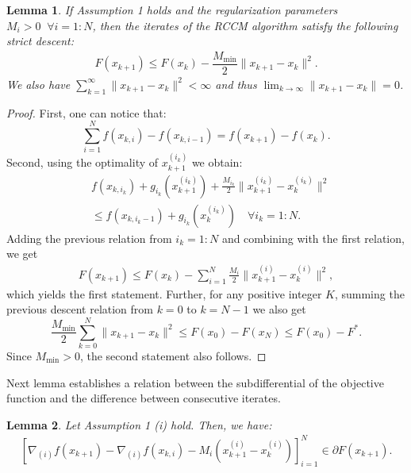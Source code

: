 \documentclass[lettersize,journal]{IEEEtran}
\newcommand{\xkik}{{x}_{k,i_{k}}}
\newtheorem{lem}{Lemma}
\begin{document}
\begin{lem}
		\label{lemma:1}
		If Assumption 1 holds and  the regularization parameters $M_i> 0 \;\;  \forall i=1:N$, then the iterates of the RCCM algorithm  satisfy the following strict descent:
		\begin{align*}
			F(x_{k+1}) \leq F(x_{k}) - \dfrac{M_{\min}}{2} \|x_{k+1} - x_{k}\|^2. 
		\end{align*}
        We also have $\sum_{k=1}^\infty \|x_{k+1} - x_{k}\|^2 < \infty$ and thus $\lim_{k \to \infty} \|x_{k+1} - x_{k}\| =0$.  
\end{lem}	

\begin{proof}
First, one can notice that:
\[  \sum_{i=1}^N f(x_{k,i}) - f(x_{k,i-1}) = f(x_{k+1}) - f(x_k).   \]
Second,  using the optimality  of  $x_{k+1}^{(i_{k})}$ we obtain:
\begin{align*}  
& f(\xkik) + g_{i_k}(x_{k+1}^{(i_k)}) + \frac{M_{i_k}}{2} \|x_{k+1}^{(i_k)} - x_k^{(i_k)}\|^2  \\
& \leq f(x_{k,i_k-1}) + g_{i_k}(x_{k}^{(i_k)}) \quad \forall i_k=1:N. 
\end{align*}
Adding the previous relation  from $i_k=1:N$ and combining with the first relation, we get
\begin{align*}
F(x_{k+1}) \leq  F(x_{k}) -   \sum_{i=1}^N  \frac{M_{i}}{2} \|x_{k+1}^{(i)} - x_k^{(i)}\|^2,  
\end{align*}
which yields the first statement. Further, for any positive integer $K$, summing the previous descent relation from $k=0$ to $k=N-1$ we also get
\[ \dfrac{M_{\min}}{2} \sum_{k=0}^N  \|x_{k+1} - x_{k}\|^2 \leq F(x_0) - F(x_N) \leq F(x_0) - F^*.  \]
Since $M_{\min} >0$, the second statement also follows. 
\end{proof}

\noindent Next lemma establishes a relation between the subdifferential of the objective function and the  difference between consecutive iterates. 
\begin{lem}
		\label{lemma:2}
Let Assumption 1 (i) hold.  Then, we have:  
		\begin{align*}
			\left[\!\nabla_{(i)} \! f(x_{k+1}) \!-\! \nabla_{(i)} \!f(x_{k,i}) -\! M_i \!\left(x_{k+1}^{(i)} \!\!-\! x_k^{(i)}\right)\!\right]_{i=1}^N \!\!\in\! \partial F(x_{k+1}).  
		\end{align*} 
\end{lem}	
\end{document}
